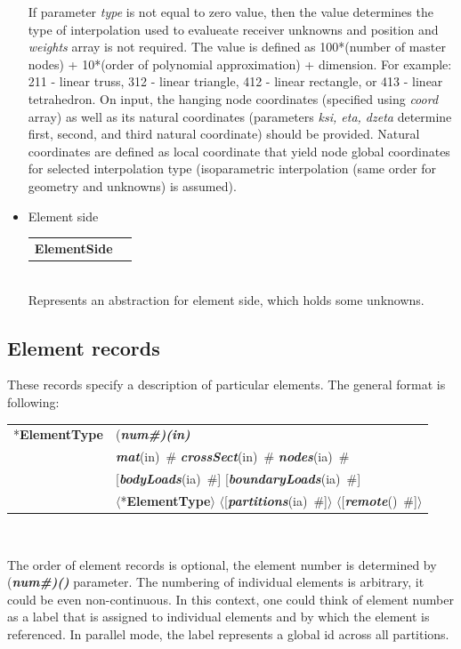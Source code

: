 \documentclass[a4paper]{article}
\makeatletter
\newcommand{\param}[1]{{\em #1}}
\newcommand{\fieldVal}[2]{\mbox{({\it\bf{#1}\#)\tiny (#2)}}}
\newcommand{\keywordnotype}[1]{\mbox{{\it{\bf{#1}}}}}
\newcommand{\keyword}[2]{\mbox{{\keywordnotype{#1}\tiny (#2)}}}
\newcommand{\entKeyword}[1]{\mbox{{*{\bf{#1}}}}}
\newcommand{\entKeywordInst}[1]{\mbox{{\bf{{#1}}}}}
\newcommand{\field}[2]{\mbox{\keyword{#1}{#2}~\#}}
\newcommand{\optField}[2]{\mbox{[\field{#1}{#2}]}}
\newcommand{\Pmode}[1]{{\sffamily #1}}
\newcommand{\PentKeyword}[1]{\mbox{{$\langle$*{\bf{#1}}$\rangle$}}}
\newcommand{\PoptField}[2]{\mbox{$\langle$[\field{#1}{#2}]$\rangle$}}
\newenvironment{record}[1][]{\begin{tabular}{|ll}}{\end{tabular}\\}
\newcommand{\recentry}[2]{{#1}&{#2}\\}
\newcounter{rcc}
\newenvironment{record}[1][\textwidth]{\setcounter{rcc}{0}\begin{tabular*}{#1}{|ll@{\extracolsep{\fill}}r}}{\end{tabular*}\\}
\newcommand{\recentry}[2]{\ifthenelse{\value{rcc}>0}{&$\backslash$ \\}{\setcounter{rcc}{1}}{#1}&{#2}}
\makeatother
\begin{document}
\begin{itemize}
If parameter \param{type} is not equal to zero value, then the value determines the type of interpolation used to
evalueate receiver unknowns and position and \param{weights} array is not required. The value is
defined as 100*(number of master nodes) + 10*(order of polynomial
approximation) + dimension. For example: 211 - linear truss, 312 -
linear triangle, 412 - linear rectangle, or 413 - linear tetrahedron.
On input, the hanging node coordinates (specified using
\param{coord} array) as well as its natural coordinates (parameters
\param{ksi, eta, dzeta} determine first, second, and third natural
coordinate) should be provided.  Natural coordinates are
defined as local coordinate that yield node global coordinates for
selected interpolation type (isoparametric interpolation (same order
for geometry and unknowns) is assumed).




\item Element side

  \begin{record}[0.9\textwidth]
    \recentry{\entKeywordInst{ElementSide}}{}
  \end{record}
  Represents an abstraction for element side, which holds some unknowns.
\end{itemize}

\subsection{Element records}
\label{_ElementsRecords}
These records specify a description of particular elements. The
general format is following:

\noindent
\begin{record}
  \recentry{\entKeyword{ElementType}}{\fieldVal{num}{in}}
  \recentry{}{\field{mat}{in} \field{crossSect}{in} \field{nodes}{ia}}
  \recentry{}{\optField{bodyLoads}{ia} \optField{boundaryLoads}{ia}}
  \recentry{}{\PentKeyword{ElementType} \PoptField{partitions}{ia} \PoptField{remote}{}}
\end{record}

The order of element records is optional, the element number is determined by \fieldVal{num}{} parameter. 
The numbering of individual elements is arbitrary, it could be even non-continuous. In this context, one could think of element number as a label that is assigned to individual elements and by which the element is referenced. 
\Pmode{In parallel mode, the label represents a global id across all partitions.}
\end{document}
